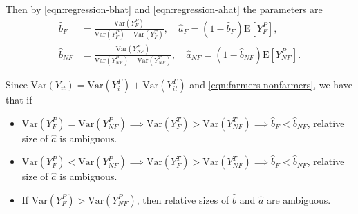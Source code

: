 \documentclass{article}
\newcommand{\E}[1]{\mathrm{E}\left[#1\right]}
\newcommand{\var}[1]{\mathrm{Var}\left(#1\right)}
\begin{document}
        Then by \eqref{eqn:regression-bhat} and \eqref{eqn:regression-ahat} the parameters are
        \begin{align}
            \hat{b}_{F} &= \frac{\var{Y_{F}^P}}{\var{Y_{F}^P} + \var{Y_{F}^T}},
            \quad
            \hat{a}_{F} = \left(1 - \hat{b}_{F}\right) \E{Y_{F}^P},
            \\
            \hat{b}_{NF} &= \frac{\var{Y_{NF}^P}}{\var{Y_{NF}^P} + \var{Y_{NF}^T}},
            \quad
            \hat{a}_{NF} = \left(1 - \hat{b}_{NF}\right) \E{Y_{NF}^P}.
        \end{align}
        
        Since $\var{Y_{it}} = \var{Y_{i}^P} + \var{Y_{it}^T}$ and \eqref{eqn:farmers-nonfarmers}, we have that if
        
        \begin{itemize}
            \item 
            $\var{Y_{F}^P} = \var{Y_{NF}^P} \implies \var{Y_{F}^T} > \var{Y_{NF}^T} \implies \hat{b}_{F} < \hat{b}_{NF}$, relative size of $\hat{a}$ is ambiguous.
            
            \item
            $\var{Y_{F}^P} < \var{Y_{NF}^P} \implies \var{Y_{F}^T} > \var{Y_{NF}^T} \implies \hat{b}_{F} < \hat{b}_{NF}$, relative size of $\hat{a}$ is ambiguous.
            
            \item
            If $\var{Y_{F}^P} > \var{Y_{NF}^P}$, then relative sizes of $\hat{b}$ and $\hat{a}$ are ambiguous.
        \end{itemize}
        
        
\end{document}
